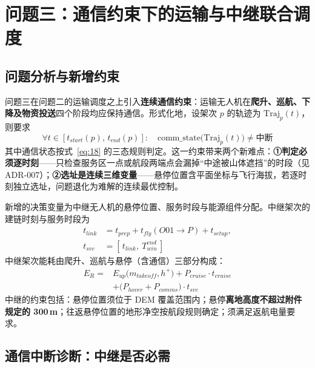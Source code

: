 \section{问题三：通信约束下的运输与中继联合调度}
\label{sec:q3}

\subsection{问题分析与新增约束}

问题三在问题二的运输调度之上引入\textbf{连续通信约束}：运输无人机在\textbf{爬升、巡航、下降及物资投送}四个阶段均应保持通信。形式化地，设架次 $p$ 的轨迹为 $\mathrm{Traj}_{p}(t)$，则要求
\begin{equation}
	\label{eq:25}
	\forall t\in[t_{start}(p),\,t_{end}(p)]:\quad
	\mathrm{comm\_state}\big(\mathrm{Traj}_{p}(t)\big)\neq\text{中断}
\end{equation}
其中通信状态按式~\eqref{eq:18} 的三态规则判定。这一约束带来两个新难点：\textbf{①判定必须逐时刻}——只检查服务区一点或航段两端点会漏掉“中途被山体遮挡”的时段（见 ADR-007）；\textbf{②选址是连续三维变量}——悬停位置含平面坐标与飞行海拔，若逐时刻独立选址，问题退化为难解的连续最优控制。

新增的决策变量为中继无人机的悬停位置、服务时段与能源组件分配\cite{zeng2016uavcomm,alhourani2014lap}。中继架次的建链时刻与服务时段为
\begin{equation}
	\label{eq:26}
	\begin{aligned}
		t_{link}&=t_{prep}+t_{fly}(O01\to P)+t_{setup},\\
		t_{svc}&=[\,t_{link},\ T_{win}^{end}\,]
	\end{aligned}
\end{equation}
中继架次能耗由爬升、巡航与悬停（含通信）三部分构成：
\begin{equation}
	\label{eq:27}
	\begin{aligned}
		E_{R}={}&E_{up}\big(m_{takeoff},h^{+}\big)+P_{cruise}\cdot t_{cruise}\\
		       &+\big(P_{hover}+P_{comms}\big)\cdot t_{svc}
	\end{aligned}
\end{equation}
中继的约束包括：悬停位置须位于 DEM 覆盖范围内；悬停\textbf{离地高度不超过附件规定的 300\,m}；往返悬停位置的地形净空按航段规则确定；须满足返航电量要求。

\subsection{通信中断诊断：中继是否必需}

